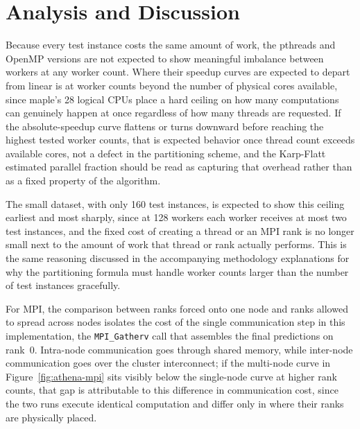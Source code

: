 \documentclass[conference]{IEEEtran}
\begin{document}
\section{Analysis and Discussion}
\label{sec:analysis}


Because every test instance costs the same amount of work, the pthreads
and OpenMP versions are not expected to show meaningful imbalance between
workers at any worker count. Where their speedup curves are expected to
depart from linear is at worker counts beyond the number of physical cores
available, since maple's 28 logical CPUs place a hard ceiling on how many
computations can genuinely happen at once regardless of how many threads
are requested. If the absolute-speedup curve flattens or turns downward
before reaching the highest tested worker counts, that is expected
behavior once thread count exceeds available cores, not a defect in the
partitioning scheme, and the Karp-Flatt estimated parallel fraction should
be read as capturing that overhead rather than as a fixed property of the
algorithm.

The small dataset, with only 160 test instances, is expected to show this
ceiling earliest and most sharply, since at 128 workers each worker
receives at most two test instances, and the fixed cost of creating a
thread or an MPI rank is no longer small next to the amount of work that
thread or rank actually performs. This is the same reasoning discussed in
the accompanying methodology explanations for why the partitioning formula
must handle worker counts larger than the number of test instances
gracefully.

For MPI, the comparison between ranks forced onto one node and ranks
allowed to spread across nodes isolates the cost of the single
communication step in this implementation, the \texttt{MPI\_Gatherv} call
that assembles the final predictions on rank~0. Intra-node communication
goes through shared memory, while inter-node communication goes over the
cluster interconnect; if the multi-node curve in
Figure~\ref{fig:athena-mpi} sits visibly below the single-node curve at
higher rank counts, that gap is attributable to this difference in
communication cost, since the two runs execute identical computation and
differ only in where their ranks are physically placed.
\end{document}
